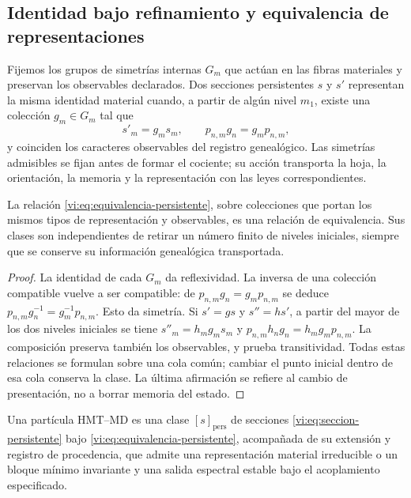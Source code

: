 \subsection{Identidad bajo refinamiento y equivalencia de representaciones}
\label{vi:subsec:identidad-material}

Fijemos los grupos de simetrías internas $G_m$ que actúan en las fibras
materiales y preservan los observables declarados. Dos secciones
persistentes $s$ y $s'$ representan la misma identidad material cuando,
a partir de algún nivel $m_1$, existe una colección $g_m\in G_m$ tal que
\begin{equation}
 s'_m=g_ms_m,\qquad
 p_{n,m}g_n=g_mp_{n,m},
 \label{vi:eq:equivalencia-persistente}
\end{equation}
y coinciden los caracteres observables del registro genealógico. Las
simetrías admisibles se fijan antes de formar el cociente; su acción
transporta la hoja, la orientación, la memoria y la representación con
las leyes correspondientes.

\begin{proposition}
\label{vi:prop:equivalencia-persistente}
La relación \eqref{vi:eq:equivalencia-persistente}, sobre colecciones que
portan los mismos tipos de representación y observables, es una relación
de equivalencia. Sus clases son independientes de retirar un número
finito de niveles iniciales, siempre que se conserve su información
genealógica transportada.
\end{proposition}
\begin{proof}
La identidad de cada $G_m$ da reflexividad. La inversa de una colección
compatible vuelve a ser compatible: de
$p_{n,m}g_n=g_mp_{n,m}$ se deduce
$p_{n,m}g_n^{-1}=g_m^{-1}p_{n,m}$. Esto da simetría.
Si $s'=gs$ y $s''=hs'$, a partir del mayor de los dos niveles iniciales
se tiene $s''_m=h_mg_ms_m$ y
$p_{n,m}h_ng_n=h_mg_mp_{n,m}$. La composición preserva también los
observables, y prueba transitividad. Todas estas relaciones se formulan
sobre una cola común; cambiar el punto inicial dentro de esa cola
conserva la clase. La última afirmación se refiere al cambio de
presentación, no a borrar memoria del estado.
\end{proof}

\begin{definition}
\label{vi:def:particula}
Una partícula HMT--MD es una clase $[s]_{\mathrm{pers}}$ de secciones
\eqref{vi:eq:seccion-persistente} bajo
\eqref{vi:eq:equivalencia-persistente}, acompañada de su extensión y
registro de procedencia, que admite una representación material
irreducible o un bloque mínimo invariante y una salida espectral estable
bajo el acoplamiento especificado.
\end{definition}

